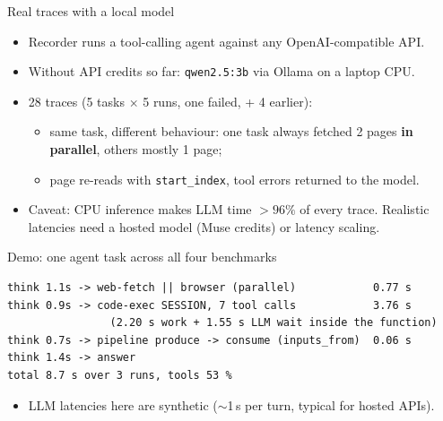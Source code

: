 \documentclass[aspectratio=169,11pt]{beamer}
\begin{document}
\begin{frame}{Real traces with a local model}
  \begin{itemize}
    \item Recorder runs a tool-calling agent against any OpenAI-compatible API.
    \item Without API credits so far: \texttt{qwen2.5:3b} via Ollama on a laptop CPU.
    \item 28 traces (5 tasks $\times$ 5 runs, one failed, + 4 earlier):
      \begin{itemize}
        \item same task, different behaviour: one task always fetched 2 pages \textbf{in parallel},
              others mostly 1 page;
        \item page re-reads with \texttt{start\_index}, tool errors returned to the model.
      \end{itemize}
    \item Caveat: CPU inference makes LLM time $>96\%$ of every trace.
          Realistic latencies need a hosted model (Muse credits) or latency scaling.
  \end{itemize}
\end{frame}

\begin{frame}[fragile]{Demo: one agent task across all four benchmarks}
\begin{verbatim}
think 1.1s -> web-fetch || browser (parallel)            0.77 s
think 0.9s -> code-exec SESSION, 7 tool calls            3.76 s
                (2.20 s work + 1.55 s LLM wait inside the function)
think 0.7s -> pipeline produce -> consume (inputs_from)  0.06 s
think 1.4s -> answer
total 8.7 s over 3 runs, tools 53 %
\end{verbatim}
  \begin{itemize}
    \item LLM latencies here are synthetic ($\sim$1\,s per turn, typical for hosted APIs).
  \end{itemize}
\end{frame}
\end{document}
